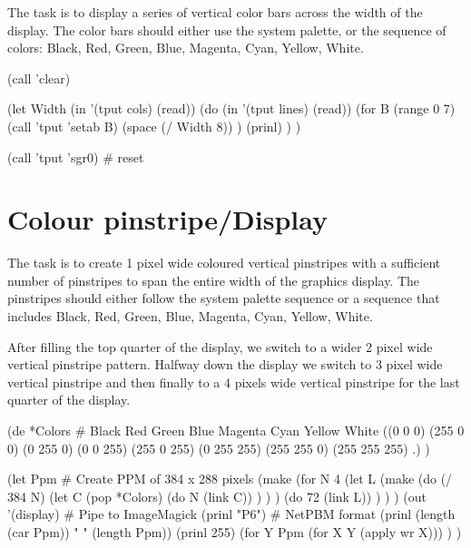 The task is to display a series of vertical color bars across the width
of the display. The color bars should either use the system palette, or
the sequence of colors: Black, Red, Green, Blue, Magenta, Cyan, Yellow,
White.


\begin{wideverbatim}

(call 'clear)

(let Width (in '(tput cols) (read))
   (do (in '(tput lines) (read))
      (for B (range 0 7)
         (call 'tput 'setab B)
         (space (/ Width 8)) )
      (prinl) ) )

(call 'tput 'sgr0)   # reset

\end{wideverbatim}

\pagebreak{}
\section*{Colour pinstripe/Display}

The task is to create 1 pixel wide coloured vertical pinstripes with a
sufficient number of pinstripes to span the entire width of the graphics
display. The pinstripes should either follow the system palette sequence
or a sequence that includes Black, Red, Green, Blue, Magenta, Cyan,
Yellow, White.

After filling the top quarter of the display, we switch to a wider 2
pixel wide vertical pinstripe pattern. Halfway down the display we
switch to 3 pixel wide vertical pinstripe and then finally to a 4 pixels
wide vertical pinstripe for the last quarter of the display.


\begin{wideverbatim}

(de *Colors  # Black Red Green Blue Magenta Cyan Yellow White
   ((0 0 0) (255 0 0) (0 255 0) (0 0 255)
      (255 0 255) (0 255   255) (255 255 0) (255 255 255) .) )
 
(let Ppm  # Create PPM of 384 x 288 pixels
   (make
      (for N 4
         (let L
            (make
               (do (/ 384 N)
                  (let C (pop *Colors)
                     (do N (link C)) ) ) )
            (do 72 (link L)) ) ) )
   (out '(display)  # Pipe to ImageMagick
      (prinl "P6")  # NetPBM format
      (prinl (length (car Ppm)) " " (length Ppm))
      (prinl 255)
      (for Y Ppm (for X Y (apply wr X))) ) )

\end{wideverbatim}

